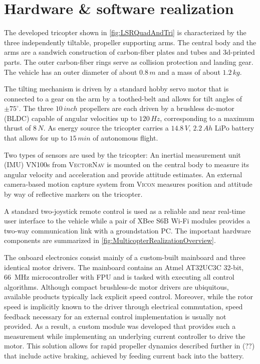 \section{Hardware \& software realization}

The developed tricopter shown in \autoref{fig:LSRQuadAndTri} is characterized by the three independently tiltable, propeller supporting arms.
The central body and the arms are a sandwich construction of carbon-fiber plates and tubes and 3d-printed parts.
The outer carbon-fiber rings serve as collision protection and landing gear.
The vehicle has an outer diameter of about $0.8\,\unit{m}$ and a mass of about $1.2\,\unit{kg}$.

The tilting mechanism is driven by a standard hobby servo motor that is connected to a gear on the arm by a toothed-belt and allows for tilt angles of $\pm 75^\circ$.
The three $10\,\unit{inch}$ propellers are each driven by a brushless dc-motor (BLDC) capable of angular velocities up to $120\,\unit{Hz}$, corresponding to a maximum thrust of $8\,\unit{N}$.
As energy source the tricopter carries a $14.8\,\unit{V}$, $2.2\,\unit{Ah}$ LiPo battery that allows for up to $15\,\unit{min}$ of autonomous flight.

Two types of sensors are used by the tricopter:
An inertial measurement unit (IMU) VN100s from \textsc{VectorNav} is mounted on the central body to measure its angular velocity and acceleration and provide attitude estimates.
An external camera-based motion capture system from \textsc{Vicon} measures position and attitude by way of reflective markers on the tricopter.

A standard two-joystick remote control is used as a reliable and near real-time user interface to the vehicle while a pair of XBee S6B Wi-Fi modules provides a two-way communication link with a groundstation PC.
The important hardware components are summarized in \autoref{fig:MulticopterRealizationOverview}.

The onboard electronics consist mainly of a custom-built mainboard and three identical motor drivers. The mainboard contains an Atmel AT32UC3C 32-bit, 66~\unit{MHz} microcontroller with FPU and is tasked with executing all control algorithms.
Although compact brushless-dc motor drivers are ubiquitous, available products typically lack explicit speed control. 
Moreover, while the rotor speed is implicitly known to the driver through electrical commutation, speed feedback necessary for an external control implementation is usually not provided. 
As a result, a custom module was developed that provides such a measurement while implementing an underlying current controller to drive the motor. 
This solution allows for rapid propeller dynamics described further in (??) that include active braking, achieved by feeding current back into the battery.


